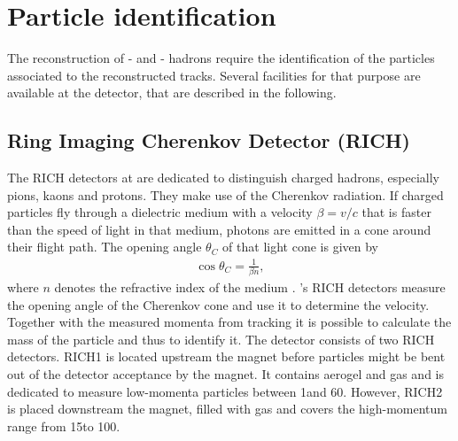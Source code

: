 \section{Particle identification}
The reconstruction of \bquark- and \cquark- hadrons require the identification of the particles associated to the reconstructed tracks.
Several facilities for that purpose are available at the \lhcb detector, that are described in the following.

\subsection{Ring Imaging Cherenkov Detector (RICH)}
The RICH detectors at \lhcb are dedicated to distinguish charged hadrons, especially pions, kaons and protons.
They make use of the Cherenkov radiation.
If charged particles fly through a dielectric medium with a velocity $\beta = v/c$ that is faster than the speed of light in that medium, photons are emitted in a cone around their flight path.
The opening angle $\theta_C$ of that light cone is given by
\begin{align}
    \cos \theta_C = \frac{1}{\beta n},
\end{align}
where $n$ denotes the refractive index of the medium \cite{Jackson_ED}.
\lhcb's RICH detectors measure the opening angle of the Cherenkov cone and use it to determine the velocity.
Together with the measured momenta from tracking it is possible to calculate the mass of the particle and thus to identify it.
The \lhcb detector consists of two RICH detectors.
RICH1 is located upstream the magnet before particles might be bent out of the \lhcb detector acceptance by the magnet.
It contains aerogel and \cfourften gas and is dedicated to measure low-momenta particles between 1\gev and 60\gev.
However, RICH2 is placed downstream the magnet, filled with \cffour gas and covers the high-momentum range from 15\gev to 100\gev \cite{detector, RICH_Performance}.

